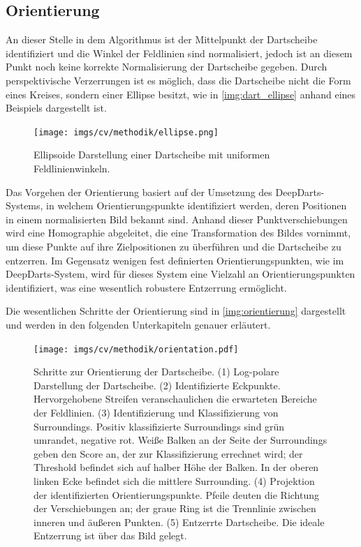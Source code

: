 \subsection{Orientierung}
\label{sec:orientierung}

An dieser Stelle in dem Algorithmus ist der Mittelpunkt der Dartscheibe identifiziert und die Winkel der Feldlinien sind normalisiert, jedoch ist an diesem Punkt noch keine korrekte Normalisierung der Dartscheibe gegeben. Durch perspektivische Verzerrungen ist es möglich, dass die Dartscheibe nicht die Form eines Kreises, sondern einer Ellipse besitzt, wie in \autoref{img:dart_ellipse} anhand eines Beispiels dargestellt ist.

\begin{figure}
    \centering
    \texttt{[image: imgs/cv/methodik/ellipse.png]}
    \caption{Ellipsoide Darstellung einer Dartscheibe mit uniformen Feldlinienwinkeln.}
    \label{img:dart_ellipse}
\end{figure}

Das Vorgehen der Orientierung basiert auf der Umsetzung des DeepDarts-Systems, in welchem Orientierungspunkte identifiziert werden, deren Positionen in einem normalisierten Bild bekannt sind. Anhand dieser Punktverschiebungen wird eine Homographie abgeleitet, die eine Transformation des Bildes vornimmt, um diese Punkte auf ihre Zielpositionen zu überführen und die Dartscheibe zu entzerren. Im Gegensatz wenigen fest definierten Orientierungspunkten, wie im DeepDarts-System, wird für dieses System eine Vielzahl an Orientierungspunkten identifiziert, was eine wesentlich robustere Entzerrung ermöglicht.

Die wesentlichen Schritte der Orientierung sind in \autoref{img:orientierung} dargestellt und werden in den folgenden Unterkapiteln genauer erläutert.

\begin{figure}
    \centering
    \texttt{[image: imgs/cv/methodik/orientation.pdf]}
    \caption{Schritte zur Orientierung der Dartscheibe. (1) Log-polare Darstellung der Dartscheibe. (2) Identifizierte Eckpunkte. Hervorgehobene Streifen veranschaulichen die erwarteten Bereiche der Feldlinien. (3) Identifizierung und Klassifizierung von Surroundings. Positiv klassifizierte Surroundings sind grün umrandet, negative rot. Weiße Balken an der Seite der Surroundings geben den Score an, der zur Klassifizierung errechnet wird; der Threshold befindet sich auf halber Höhe der Balken. In der oberen linken Ecke befindet sich die mittlere Surrounding. (4) Projektion der identifizierten Orientierungspunkte. Pfeile deuten die Richtung der Verschiebungen an; der graue Ring ist die Trennlinie zwischen inneren und äußeren Punkten. (5) Entzerrte Dartscheibe. Die ideale Entzerrung ist über das Bild gelegt.}
    \label{img:orientierung}
\end{figure}

